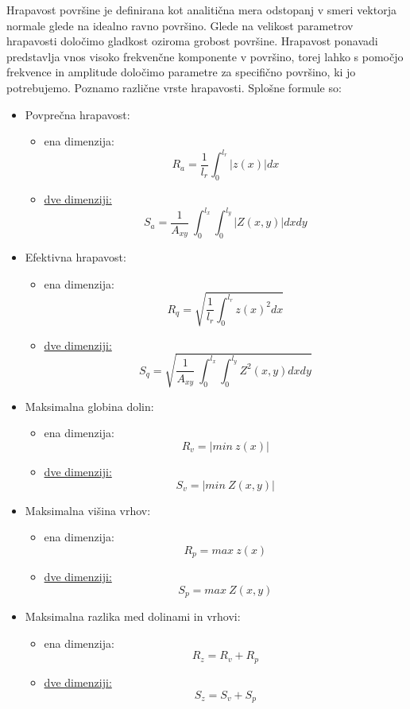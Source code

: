 \documentclass[a4paper,twoside,openright,12pt,slovene]{book}
\begin{document}
Hrapavost površine je definirana kot analitična mera odstopanj v smeri vektorja normale glede na idealno ravno površino. Glede na velikost parametrov hrapavosti določimo gladkost oziroma grobost površine. Hrapavost ponavadi predstavlja vnos visoko frekvenčne komponente v površino, torej lahko s pomočjo frekvence in amplitude določimo parametre za specifično površino, ki jo potrebujemo. Poznamo različne vrste hrapavosti. Splošne formule so:
\begin{itemize}
    \item Povprečna hrapavost: 
    \begin{itemize}
        \item ena dimenzija:     \[R_{a} = \frac{1}{l_{r}} \int_{0}^{l_{r}} |z(x)| dx\]
        \item \hyperref[fig:SaSq]{dve dimenziji:}     \[S_{a} = \frac{1}{A_{xy}}\ \int_{0}^{l_{x}} \int_{0}^{l_{y}} |Z(x,y)| dx dy\] 
    \end{itemize}
    
    \clearpage
    
    \item Efektivna hrapavost:
    \begin{itemize}
        \item ena dimenzija:     \[R_{q} = \sqrt{\frac{1}{l_{r}} \int_{0}^{l_{r}} z(x)^2 dx}\]
        \item \hyperref[fig:SaSq]{dve dimenziji:}     \[S_{q} = \sqrt{\frac{1}{A_{xy}}\ \int_{0}^{l_{x}} \int_{0}^{l_{y}} Z^2(x,y) dx dy}\]
    \end{itemize}
    
    
    \item Maksimalna globina dolin:
    \begin{itemize}
        \item ena dimenzija:     \[R_{v} = |min\ z(x)|\]
        \item \hyperref[fig:SvSp]{dve dimenziji:}     \[S_{v} = |min\ Z(x, y)|\]
    \end{itemize}
    
    
    \item Maksimalna višina vrhov:
    \begin{itemize}
        \item ena dimenzija:     \[R_{p} = max\ z(x)\]
        \item \hyperref[fig:SvSp]{dve dimenziji:}     \[S_{p} = max\ Z(x, y)\]
    \end{itemize}
    
    
    
    \item Maksimalna razlika med dolinami in vrhovi:
    \begin{itemize}
        \item ena dimenzija:     \[R_{z} = R_{v} + R_{p}\]
        \item \hyperref[fig:Sz]{dve dimenziji:}     \[S_{z} = S_{v} + S_{p}\]
    \end{itemize}
    
\end{itemize}
\end{document}

